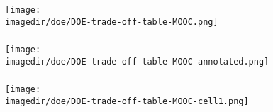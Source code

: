 \begin{comment}
	
	
	\begin{frame}\frametitle{\texttt{[image: \\imagedir/doe/examples/advice-logo.png]}\,\, plan your experiments carefully ahead of time}
	\end{frame}
	
	\begin{columns}[T]
		\column{0.45\textwidth}
			\texttt{[image: \\imagedir/statistics/flicfcb\_o.jpg]}
		
			{\scriptsize (p. 230 in Box, Hunter and Hunter, 2$^\text{nd}$ ed)}
		
		\column{0.48\textwidth}
			\texttt{[image: \\imagedir/doe/examples/solar-panel-mendelu-cz-website.png]}
		
		
			\see{\href{http://tiny.cc/solar-panel-study}{http://tiny.cc/solar-panel-study}}
	\end{columns}
	
	\begin{center}\rule[8mm]{4cm}{0.01cm}\end{center}
	\rule[3mm]{0.01cm}{25mm}%

\end{comment}
\begin{frame}\frametitle{}
	\begin{center}
	\texttt{[image: \\imagedir/doe/DOE-trade-off-table-MOOC.png]}
	\end{center}
\end{frame}

\begin{frame}\frametitle{}
	\begin{center}
	\texttt{[image: \\imagedir/doe/DOE-trade-off-table-MOOC-annotated.png]}
	\end{center}
\end{frame}

\begin{frame}\frametitle{}
	\begin{center}
	\texttt{[image: \\imagedir/doe/DOE-trade-off-table-MOOC-cell1.png]}
	\end{center}
\end{frame}

